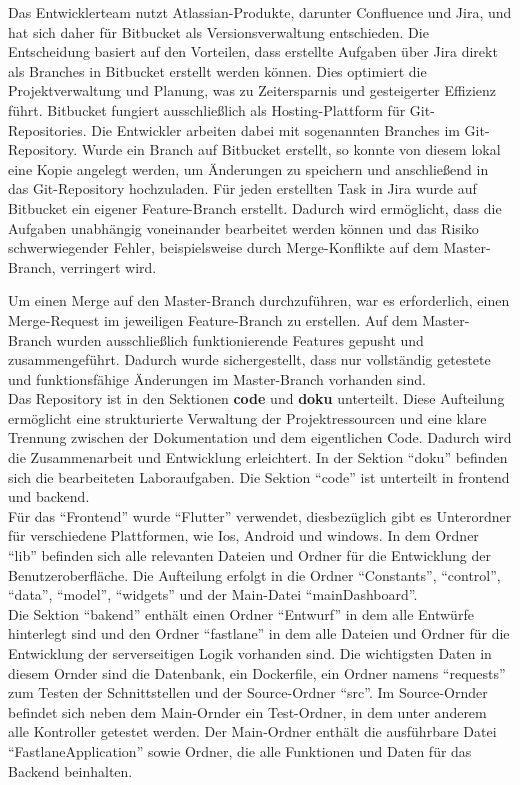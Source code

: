 Das Entwicklerteam nutzt Atlassian-Produkte, darunter Confluence und Jira, und hat sich daher für Bitbucket als Versionsverwaltung entschieden.
Die Entscheidung basiert auf den Vorteilen, dass erstellte Aufgaben über Jira direkt als Branches in Bitbucket erstellt werden können.
Dies optimiert die Projektverwaltung und Planung, was zu Zeitersparnis und gesteigerter Effizienz führt.
Bitbucket fungiert ausschließlich als Hosting-Plattform für Git-Repositories.
Die Entwickler arbeiten dabei mit sogenannten Branches im Git-Repository.
Wurde ein Branch auf Bitbucket erstellt, so konnte von diesem lokal eine Kopie angelegt werden, um Änderungen zu speichern und anschließend in das Git-Repository hochzuladen.
Für jeden erstellten Task in Jira wurde auf Bitbucket ein eigener Feature-Branch erstellt.
Dadurch wird ermöglicht, dass die Aufgaben unabhängig voneinander bearbeitet werden können und das Risiko schwerwiegender Fehler, beispielsweise durch Merge-Konflikte auf dem Master-Branch, verringert wird.

Um einen Merge auf den Master-Branch durchzuführen, war es erforderlich, einen Merge-Request im jeweiligen Feature-Branch zu erstellen.
Auf dem Master-Branch wurden ausschließlich funktionierende Features gepusht und zusammengeführt.
Dadurch wurde sichergestellt, dass nur vollständig getestete und funktionsfähige Änderungen im Master-Branch vorhanden sind.\\

Das Repository ist in den Sektionen \textbf{code} und \textbf{doku} unterteilt.
Diese Aufteilung ermöglicht eine strukturierte Verwaltung der Projektressourcen und eine klare Trennung zwischen der Dokumentation und dem eigentlichen Code.
Dadurch wird die Zusammenarbeit und Entwicklung erleichtert.
In der Sektion \enquote{doku} befinden sich die bearbeiteten Laboraufgaben.
Die Sektion \enquote{code} ist unterteilt in frontend und backend.  \\
Für das \enquote{Frontend} wurde \enquote{Flutter} verwendet, diesbezüglich gibt es Unterordner für verschiedene Plattformen, wie Ios, Android und windows.
In dem Ordner \enquote{lib} befinden sich alle relevanten Dateien und Ordner für die Entwicklung der Benutzeroberfläche.
Die Aufteilung erfolgt in die Ordner \enquote{Constants}, \enquote{control}, \enquote{data}, \enquote{model}, \enquote{widgets} und der Main-Datei \enquote{mainDashboard}.    \\
Die Sektion \enquote{bakend} enthält einen Ordner \enquote{Entwurf} in dem alle Entwürfe hinterlegt sind und den Ordner \enquote{fastlane}
in dem alle Dateien und Ordner für die Entwicklung der serverseitigen Logik vorhanden sind.
Die wichtigsten Daten in diesem Ornder sind die Datenbank, ein Dockerfile, ein Ordner namens \enquote{requests} zum Testen der Schnittstellen und der Source-Ordner \enquote{src}.
Im Source-Ornder befindet sich neben dem Main-Ornder ein Test-Ordner, in dem unter anderem alle Kontroller getestet werden.
Der Main-Ordner enthält die ausführbare Datei \enquote{FastlaneApplication} sowie Ordner, die alle Funktionen und Daten für das Backend beinhalten.




